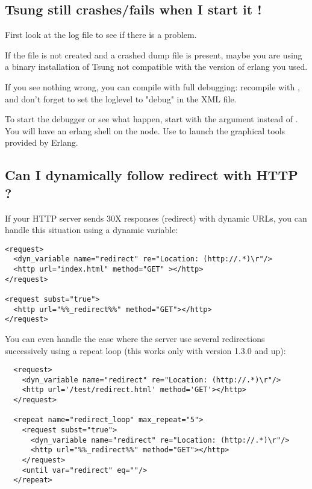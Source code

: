 \documentclass{TSUNG-en}
\begin{document}
\begin{appendix}
\subsection{Tsung still crashes/fails  when I start it !}
First look at the log file
 to see
if there is a problem.

If the file is not created and a crashed dump file is present, maybe
you are using a binary installation of Tsung not compatible with the
version of erlang you used.

If you see nothing wrong, you can compile  with full
debugging: recompile with  , and
don't forget to set the loglevel to "debug" in the XML file.

To start the debugger or see what happen, start  with the
 argument instead of . You will have
an erlang shell on the  node. Use
 to launch the graphical tools provided by
Erlang.

\subsection{Can I dynamically follow redirect with HTTP ?}

If your HTTP server sends 30X responses (redirect) with dynamic URLs,
you can handle this situation using a dynamic variable:

\begin{Verbatim}
<request>
  <dyn_variable name="redirect" re="Location: (http://.*)\r"/>
  <http url="index.html" method="GET" ></http>
</request>

<request subst="true">
  <http url="%%_redirect%%" method="GET"></http>
</request>
\end{Verbatim}

You can even handle the case where the server use several redirections
successively using a repeat loop (this works only with version 1.3.0 and up):

\begin{Verbatim}
  <request>
    <dyn_variable name="redirect" re="Location: (http://.*)\r"/>
    <http url='/test/redirect.html' method='GET'></http>
  </request>

  <repeat name="redirect_loop" max_repeat="5">
    <request subst="true">
      <dyn_variable name="redirect" re="Location: (http://.*)\r"/>
      <http url="%%_redirect%%" method="GET"></http>
    </request>
    <until var="redirect" eq=""/>
  </repeat>
\end{Verbatim}


\end{appendix}
\end{document}
